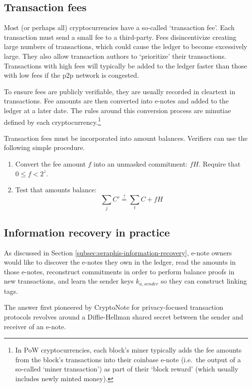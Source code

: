 \subsection{Transaction fees}
\label{subsec:implementers-transaction-fees}

Most (or perhaps all) cryptocurrencies have a so-called `transaction fee'. Each transaction must send a small fee to a third-party. Fees disincentivize creating large numbers of transactions, which could cause the ledger to become excessively large. They also allow transaction authors to `prioritize' their transactions. Transactions with high fees will typically be added to the ledger faster than those with low fees if the p2p network is congested.

To ensure fees are publicly verifiable, they are usually recorded in cleartext in transactions. Fee amounts are then converted into e-notes and added to the ledger at a later date. The rules around this conversion process are minutiae defined by each cryptocurrency.\footnote{In PoW cryptocurrencies, each block's miner typically adds the fee amounts from the block's transactions into their coinbase e-note (i.e.\ the output of a so-called `miner transaction') as part of their `block reward' (which usually includes newly minted money).}

Transaction fees must be incorporated into amount balances. Verifiers can use the following simple procedure.

\begin{enumerate}
    \item Convert the fee amount $f$ into an unmasked commitment: $f H$. Require that $0 \leq f < 2^z$.
    \item Test that amounts balance:
    \[\sum_j C' \stackrel{?}{=} \sum_t C + f H\]
\end{enumerate}


\subsection{Information recovery in practice}
\label{subsec:implementers-information-recovery}

As discussed in Section \ref{subsec:seraphis-information-recovery}, e-note owners would like to discover the e-notes they own in the ledger, read the amounts in those e-notes, reconstruct commitments in order to perform balance proofs in new transactions, and learn the sender keys $k_{a,sender}$ so they can construct linking tags.

The answer first pioneered by CryptoNote \cite{cryptoNoteWhitePaper} for privacy-focused transaction protocols revolves around a Diffie-Hellman shared secret between the sender and receiver of an e-note.

